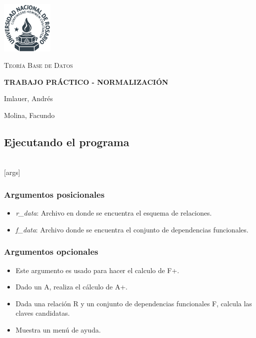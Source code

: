 \documentclass{article}
\begin{document}
\begin{titlepage}
	\centering
	\includegraphics[width=2.5cm]{unr.png}\par\vspace{1cm}
	{\scshape \fontsize{8}{4} \selectfont {FACULTAD DE CIENCIAS EXACTAS, INGENIERÍA Y AGRIMENSURA} \par}
	\vspace{1cm}
	{\scshape\Large Teoría Base de Datos\par}
	\vspace{1.5cm}
	{\large \bfseries TRABAJO PRÁCTICO - NORMALIZACIÓN\par}
	\vspace{4cm}
	\large \fontsize{12}{5} \selectfont Imlauer, Andrés  \par Molina, Facundo
\end{titlepage}
\noindent
\subsection{Ejecutando el programa}
\noindent
\small {\selectfont {\$ chmod +x tp4.py }} \\
\small {\selectfont {\$ ./tp4.py r\_data f\_data} [args] }
\subsubsection{Argumentos posicionales} 
\begin{itemize}
  \item
    {\textit{r\_data}}: Archivo en donde se encuentra el esquema de relaciones.
  \item
    {\textit{f\_data}}: Archivo donde se encuentra el conjunto de dependencias funcionales.
\end{itemize}
\subsubsection{Argumentos opcionales} 
\begin{itemize}
  \item
    {} Este argumento es usado para hacer el calculo de F+.
  \item
    {} Dado un A, realiza el cálculo de A+.
  \item
    {} Dada una relación R y un conjunto de dependencias funcionales F, calcula las 
    claves candidatas.
  \item
    {} Muestra un menú de ayuda.
\end{itemize}
\end{document}
